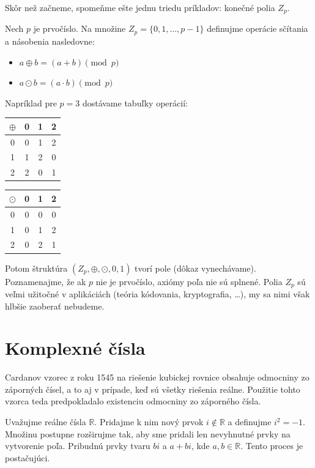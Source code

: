 \documentclass[11pt,a4paper]{article}
\theoremstyle{definition}
\theoremstyle{plain}
\theoremstyle{remark}
\newcommand{\R}{\mathbb{R}}
\begin{document}
Skôr než začneme, spomeňme ešte jednu triedu príkladov: konečné polia $Z_p$.

Nech $p$ je prvočíslo. Na množine $Z_p = \{0, 1, \dots, p-1\}$ definujme operácie sčítania a násobenia nasledovne:
\begin{itemize}
    \item $a \oplus b = (a+b) \pmod p$
    \item $a \odot b = (a \cdot b) \pmod p$
\end{itemize}

Napríklad pre $p=3$ dostávame tabuľky operácií:

\begin{center}
\begin{tabular}{c|ccc}
$\oplus$ & 0 & 1 & 2 \\
\hline
0 & 0 & 1 & 2 \\
1 & 1 & 2 & 0 \\
2 & 2 & 0 & 1
\end{tabular}
\hspace{2cm}
\begin{tabular}{c|ccc}
$\odot$ & 0 & 1 & 2 \\
\hline
0 & 0 & 0 & 0 \\
1 & 0 & 1 & 2 \\
2 & 0 & 2 & 1
\end{tabular}
\end{center}

Potom štruktúra $(Z_p, \oplus, \odot, 0, 1)$ tvorí pole (dôkaz vynechávame). Poznamenajme, že ak $p$ nie je prvočíslo, axiómy poľa nie sú splnené.
Polia $Z_p$ sú veľmi užitočné v aplikáciách (teória kódovania, kryptografia, \dots), my sa nimi však hlbšie zaoberať nebudeme.

\section{Komplexné čísla}

Cardanov vzorec z roku 1545 na riešenie kubickej rovnice obsahuje odmocniny zo záporných čísel, a to aj v prípade, keď sú všetky riešenia reálne. Použitie tohto vzorca teda predpokladalo existenciu odmocniny zo záporného čísla.

Uvažujme reálne čísla $\R$. Pridajme k nim nový prvok $i \notin \R$ a definujme $i^2 = -1$. Množinu postupne rozširujme tak, aby sme pridali len nevyhnutné prvky na vytvorenie poľa. Pribudnú prvky tvaru $bi$ a $a+bi$, kde $a, b \in \R$. Tento proces je postačujúci.
\end{document}
